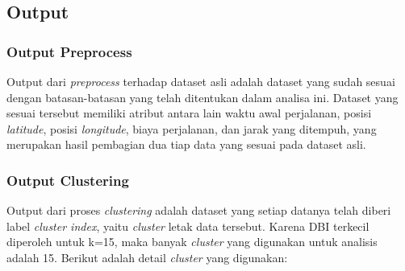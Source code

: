\documentclass{article}
\begin{document}
\subsection{Output}

\subsubsection{Output Preprocess}

\begin{adjustwidth}{4em}{0pt}
	
	\hspace{\parindent}Output dari \textit{preprocess} terhadap dataset asli adalah dataset yang sudah sesuai dengan batasan-batasan yang telah ditentukan dalam analisa ini. Dataset yang sesuai tersebut memiliki atribut antara lain waktu awal perjalanan, posisi \textit{latitude}, posisi \textit{longitude}, biaya perjalanan, dan jarak yang ditempuh, yang merupakan hasil pembagian dua tiap data yang sesuai pada dataset asli.

\end{adjustwidth}

\subsubsection{Output Clustering}

\begin{adjustwidth}{4em}{0pt}
	
	\hspace{\parindent}Output dari proses \textit{clustering} adalah dataset yang setiap datanya telah diberi label \textit{cluster index}, yaitu \textit{cluster} letak data tersebut. Karena DBI terkecil diperoleh untuk k=15, maka banyak \textit{cluster} yang digunakan untuk analisis adalah 15. Berikut adalah detail \textit{cluster} yang digunakan:

\end{adjustwidth}
\end{document}
